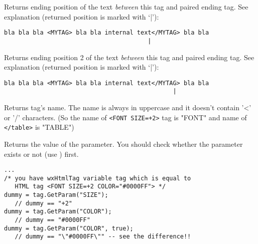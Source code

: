 \label{wxhtmltaggetendpos1}


Returns ending position of the text {\it between} this tag and paired
ending tag.
See explanation (returned position is marked with `|'):

\begin{verbatim}
bla bla bla <MYTAG> bla bla internal text</MYTAG> bla bla
                                        |
\end{verbatim}


\label{wxhtmltaggetendpos2}


Returns ending position 2 of the text {\it between} this tag and paired
ending tag.
See explanation (returned position is marked with `|'):

\begin{verbatim}
bla bla bla <MYTAG> bla bla internal text</MYTAG> bla bla
                                               |
\end{verbatim}

\label{wxhtmltaggetname}


Returns tag's name. The name is always in uppercase and it doesn't contain
'<' or '/' characters. (So the name of {\tt <FONT SIZE=+2>} tag is "FONT"
and name of {\tt </table>} is "TABLE")


\label{wxhtmltaggetparam}


Returns the value of the parameter. You should check whether the
parameter exists or not (use ) first.





\begin{verbatim}
...
/* you have wxHtmlTag variable tag which is equal to
   HTML tag <FONT SIZE=+2 COLOR="#0000FF"> */
dummy = tag.GetParam("SIZE");
   // dummy == "+2"
dummy = tag.GetParam("COLOR");
   // dummy == "#0000FF"
dummy = tag.GetParam("COLOR", true);
   // dummy == "\"#0000FF\"" -- see the difference!!
\end{verbatim}

